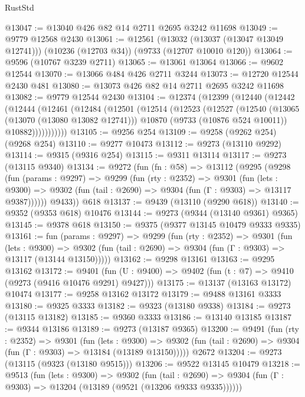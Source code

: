 \begin{lexlean}{RustStd}
\begin{coremodule}
{\begin{coremodule}
{{{{{{{{{{{{{{{{{{{{{{{{{{{{{{{{{{{{{{{{{{{{{{{{{{{{{{{@13047 := @13040 @426 @82 @14 @2711 @2695 @3242 @11698
@13049 := @9779 @12568 @2430
@13061 := @12561
    (@13032 (@13037 (@13047 @13049 @12741)))
    (@10236 (@12703 @34))
    (@9733 (@12707 @10010 @120))
@13064 := @9596 (@10767 @3239 @2711)
@13065 := @13061 @13064
@13066 := @9602 @12544
@13070 := @13066 @484 @426 @2711 @3244
@13073 := @12720 @12544 @2430 @481
@13080 := @13073 @426 @82 @14 @2711 @2695 @3242 @11698
@13082 := @9779 @12544 @2430
@13104 := @12374
    (@12399
      (@12440
        (@12442
          (@12444
            (@12461
              (@12484
                (@12501
                  (@12514
                    (@12523
                      (@12527
                        (@12540
                          (@13065 (@13070 (@13080 @13082 @12741)))
                          @10870
                          (@9733 (@10876 @524 @10011))
                          @10882)))))))))))
@13105 := @9256 @254
@13109 := @9258 (@9262 @254) (@9268 @254)
@13110 := @9277 @10473
@13112 := @9273 (@13110 @9292)
@13114 := @9315 (@9316 @254)
@13115 := @9311 @13114
@13117 := @9273 (@13115 @9340)
@13134 := @9272
    (fun (fn : @58) =>
    @13112
      (@9295
        (@9298
          (fun (params : @9297) =>
          @9299
            (fun (rty : @2352) =>
            @9301
              (fun (lets : @9300) =>
              @9302 (fun (tail : @2690) => @9304 (fun (Γ : @9303) => @13117 @9387))))))
        @9433))
    @618
@13137 := @9439 (@13110 (@9290 @618))
@13140 := @9352 (@9353 @618) @10476
@13144 := @9273 (@9344 (@13140 @9361) @9365)
@13145 := @9378 @618
@13150 := @9375 (@9377 @13145 @10479 @9333 @9335)
@13161 := fun (params : @9297) =>
  @9299
    (fun (rty : @2352) =>
    @9301
      (fun (lets : @9300) =>
      @9302 (fun (tail : @2690) => @9304 (fun (Γ : @9303) => @13117 (@13144 @13150)))))
@13162 := @9298 @13161
@13163 := @9295 @13162
@13172 := @9401
    (fun (U : @9400) => @9402 (fun (t : @7) => @9410 (@9273 (@9416 @10476 @9291) @9427)))
@13175 := @13137 (@13163 @13172) @10474
@13177 := @9258 @13162 @13172
@13179 := @9488 @13161 @3333
@13180 := @9325 @3333
@13182 := @9323 (@13180 @9338)
@13184 := @9273 (@13115 @13182)
@13185 := @9360 @3333
@13186 := @13140 @13185
@13187 := @9344 @13186
@13189 := @9273 (@13187 @9365)
@13200 := @9491
    (fun (rty : @2352) =>
    @9301
      (fun (lets : @9300) =>
      @9302 (fun (tail : @2690) => @9304 (fun (Γ : @9303) => @13184 (@13189 @13150)))))
    @2672
@13204 := @9273 (@13115 (@9323 (@13180 @9515)))
@13206 := @9522 @13145 @10479
@13218 := @9513
    (fun (lets : @9300) =>
    @9302
      (fun (tail : @2690) =>
      @9304 (fun (Γ : @9303) => @13204 (@13189 (@9521 (@13206 @9333 @9335))))))
}}}}}}}}}}}}}}}}}}}}}}}}}}}}}}}}}}}}}}}}}}}}}}}}}}}}}}}
\end{coremodule}}
\end{coremodule}
\end{lexlean}
